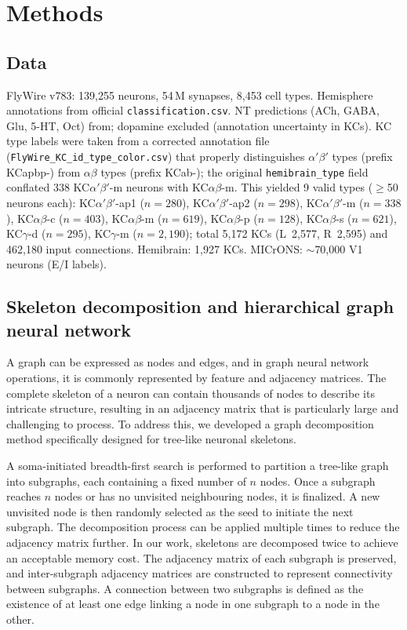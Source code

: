 \documentclass[10pt]{article}
\begin{document}
\section*{Methods}

\subsection*{Data}
FlyWire v783\cite{dorkenwald2024flywire,schlegel2024flywire}: 139,255 neurons, 54\,M synapses, 8,453 cell types. Hemisphere annotations from official \texttt{classification.csv}. NT predictions (ACh, GABA, Glu, 5-HT, Oct) from\cite{eckstein2020neurotransmitter}; dopamine excluded (annotation uncertainty in KCs). KC type labels were taken from a corrected annotation file (\texttt{FlyWire\_KC\_id\_type\_color.csv}) that properly distinguishes $\alpha'\beta'$ types (prefix KCapbp-) from $\alpha\beta$ types (prefix KCab-); the original \texttt{hemibrain\_type} field conflated 338 KC$\alpha'\beta'$-m neurons with KC$\alpha\beta$-m. This yielded 9 valid types ($\geq$50 neurons each): KC$\alpha'\beta'$-ap1 ($n=280$), KC$\alpha'\beta'$-ap2 ($n=298$), KC$\alpha'\beta'$-m ($n=338$), KC$\alpha\beta$-c ($n=403$), KC$\alpha\beta$-m ($n=619$), KC$\alpha\beta$-p ($n=128$), KC$\alpha\beta$-s ($n=621$), KC$\gamma$-d ($n=295$), KC$\gamma$-m ($n=2{,}190$); total 5,172 KCs (L~2,577, R~2,595) and 462,180 input connections. Hemibrain\cite{scheffer2020hemibrain}: 1,927 KCs. MICrONS\cite{microns2021cortical}: $\sim$70,000 V1 neurons (E/I labels).

\subsection*{Skeleton decomposition and hierarchical graph neural network}
A graph can be expressed as nodes and edges, and in graph neural network operations, it is commonly represented by feature and adjacency matrices. The complete skeleton of a neuron can contain thousands of nodes to describe its intricate structure, resulting in an adjacency matrix that is particularly large and challenging to process. To address this, we developed a graph decomposition method specifically designed for tree-like neuronal skeletons.

A soma-initiated breadth-first search is performed to partition a tree-like graph into subgraphs, each containing a fixed number of $n$ nodes. Once a subgraph reaches $n$ nodes or has no unvisited neighbouring nodes, it is finalized. A new unvisited node is then randomly selected as the seed to initiate the next subgraph. The decomposition process can be applied multiple times to reduce the adjacency matrix further. In our work, skeletons are decomposed twice to achieve an acceptable memory cost. The adjacency matrix of each subgraph is preserved, and inter-subgraph adjacency matrices are constructed to represent connectivity between subgraphs. A connection between two subgraphs is defined as the existence of at least one edge linking a node in one subgraph to a node in the other.
\end{document}
